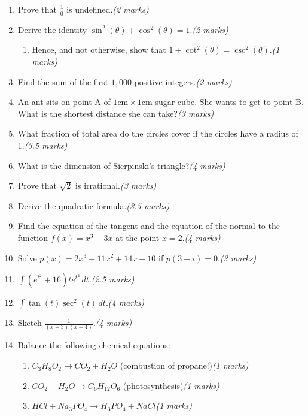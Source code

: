 \documentclass{article}
\begin{document}
\begin{enumerate}
    \item Prove that $\frac{1}{0}$ is undefined.\hfill{}\textit{(2 marks)}
    \item Derive the identity $\sin ^2(\theta) + \cos ^2(\theta) = 1$.\hfill{}\textit{(2 marks)}
        \begin{enumerate}[label*=\arabic*.]
            \item Hence, and not otherwise, show that $1 + \cot ^2(\theta) = \csc ^2(\theta)$.\hfill{}\textit{(1 marks)}
        \end{enumerate}
    \item Find the sum of the first $1,000$ positive integers.\hfill{}\textit{(2 marks)}
    \item An ant sits on point A of $1\text{cm} \times 1\text{cm}$ sugar cube. She wants to get to point B. What is the shortest distance she can take?\hfill{}\textit{(3 marks)}
    \item What fraction of total area do the circles cover if the circles have a radius of 1.\hfill{}\textit{(3.5 marks)}
    \item What is the dimension of Sierpinski's triangle?\hfill{}\textit{(4 marks)}
    \item Prove that $\sqrt{2}$ is irrational.\hfill{}\textit{(3 marks)}
    \item Derive the quadratic formula.\hfill{}\textit{(3.5 marks)}
    \item Find the equation of the tangent and the equation of the normal to the function $f(x) = x^3 - 3x$ at the point $x = 2$.\hfill{}\textit{(4 marks)}
    \item Solve $p(x) = 2x^3 - 11x^2 +14x + 10$ if $p(3 + i) = 0$.\hfill{}\textit{(3 marks)}
    \item $\int (e^{t^2} + 16) te^{t^2} \, dt$.\hfill{}\textit{(2.5 marks)}
    \item $\int \tan (t) \sec ^2(t) \, dt$.\hfill{}\textit{(4 marks)}
    \item Sketch $\frac{1}{(x-3)(x-4)}$.\hfill{}\textit{(4 marks)}
    \item Balance the following chemical equations:
        \begin{enumerate}[label*=\arabic*.]
            \item $C_3H_8O_2 \rightarrow CO_2 + H_2O$ (combustion of propane!)\hfill{}\textit{(1 marks)}
            \item $CO_2 + H_2O \rightarrow C_6H_{12}O_6$ (photosynthesis)\hfill{}\textit{(1 marks)}
            \item $HCl + Na_3PO_4 \rightarrow H_3PO_4 + NaCl$\hfill{}\textit{(1 marks)}

\end{enumerate}
\end{enumerate}
\end{document}

